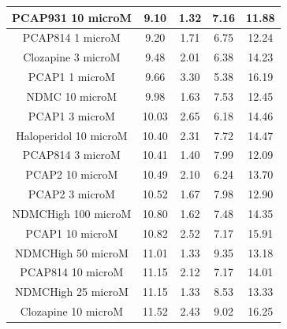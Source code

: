 \documentclass[a4paper,12pt]{article}
\begin{document}
\begin{table}[h!]
\begin{tabular}{|c|c|c|c|c|}
PCAP931 10 microM      & 9.10   & 1.32 & 7.16 & 11.88 \\ \hline
PCAP814 1 microM       & 9.20   & 1.71 & 6.75 & 12.24 \\ \hline
Clozapine 3 microM     & 9.48  & 2.01 & 6.38 & 14.23 \\ \hline
PCAP1 1 microM         & 9.66  & 3.30  & 5.38 & 16.19 \\ \hline
NDMC 10 microM         & 9.98  & 1.63 & 7.53 & 12.45 \\ \hline
PCAP1 3 microM         & 10.03 & 2.65 & 6.18 & 14.46 \\ \hline
Haloperidol 10 microM  & 10.40  & 2.31 & 7.72 & 14.47 \\ \hline
PCAP814 3 microM       & 10.41 & 1.40  & 7.99 & 12.09 \\ \hline
PCAP2 10 microM        & 10.49 & 2.10  & 6.24 & 13.70  \\ \hline
PCAP2 3 microM         & 10.52 & 1.67 & 7.98 & 12.90  \\ \hline
NDMCHigh 100 microM    & 10.80  & 1.62 & 7.48 & 14.35 \\ \hline
PCAP1 10 microM        & 10.82 & 2.52 & 7.17 & 15.91 \\ \hline
NDMCHigh 50 microM     & 11.01 & 1.33 & 9.35 & 13.18 \\ \hline
PCAP814 10 microM      & 11.15 & 2.12 & 7.17 & 14.01 \\ \hline
NDMCHigh 25 microM     & 11.15 & 1.33 & 8.53 & 13.33 \\ \hline
Clozapine 10 microM    & 11.52 & 2.43 & 9.02 & 16.25 \\ \hline
\end{tabular}
\end{table}
\newpage
\end{document}
